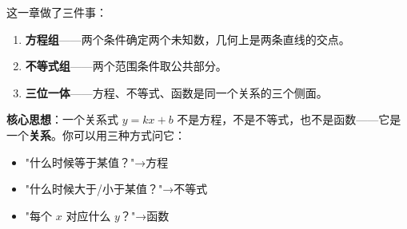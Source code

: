 
这一章做了三件事：

\begin{enumerate}
  \item \textbf{方程组}——两个条件确定两个未知数，几何上是两条直线的交点。
  \item \textbf{不等式组}——两个范围条件取公共部分。
  \item \textbf{三位一体}——方程、不等式、函数是同一个关系的三个侧面。
\end{enumerate}

\textbf{核心思想}：一个关系式 $y=kx+b$ 不是方程，不是不等式，也不是函数——它是一个\textbf{关系}。你可以用三种方式问它：
\begin{itemize}
  \item "什么时候等于某值？"→方程
  \item "什么时候大于/小于某值？"→不等式
  \item "每个 $x$ 对应什么 $y$？"→函数
\end{itemize}

